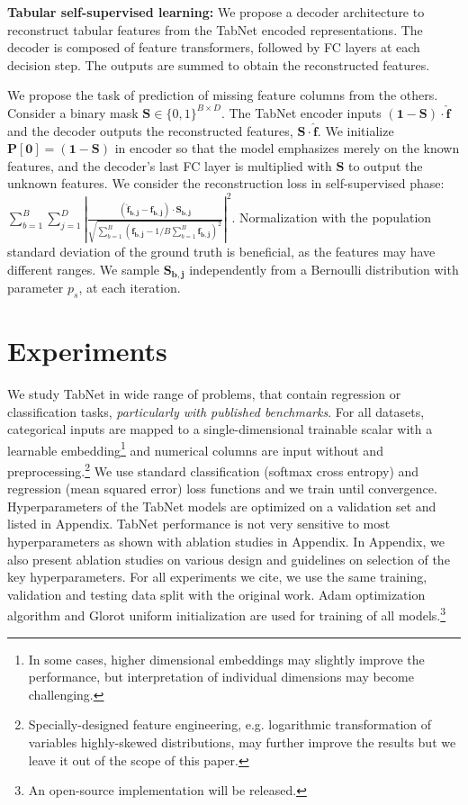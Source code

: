 {\textbf{Tabular self-supervised learning:}} We propose a decoder architecture to reconstruct tabular features from the TabNet encoded representations. The decoder is composed of feature transformers, followed by FC layers at each decision step. The outputs are summed to obtain the reconstructed features.

We propose the task of prediction of missing feature columns from the others. Consider a binary mask $\mathbf{S} \in \{ 0, 1 \} ^ {B \times D}$. The TabNet encoder inputs $(\mathbf{1} - \mathbf{S}) \cdot \mathbf{\hat{f}}$ and the decoder outputs the reconstructed features, $\mathbf{S} \cdot \mathbf{\hat{f}}$. 
We initialize $\mathbf{P[0]} = (\mathbf{1} - \mathbf{S})$ in encoder so that the model emphasizes merely on the known features, and the decoder's last FC layer is multiplied with $\mathbf{S}$ to output the unknown features. We consider the reconstruction loss in self-supervised phase:
$\sum_{b=1}^{B} \sum_{j=1}^{D} \left | 
\frac{ ({\mathbf{\hat{f}_{b,j}}} - \mathbf{f_{b,j}}) \cdot \mathbf{\mathbf{S_{b,j}}}}
{\sqrt{\sum_{b=1}^{B} (\mathbf{f_{b,j}} - {1/B} \sum_{b=1}^{B} \mathbf{f_{b,j}})^{2}}}
\right | ^2. $ Normalization with the population standard deviation of the ground truth is beneficial, as the features may have different ranges. We sample $\mathbf{S_{b,j}}$ independently from a Bernoulli distribution with parameter $p_s$, at each iteration. 

\section{Experiments}

We study TabNet in wide range of problems, that contain regression or classification tasks, \emph{particularly with published benchmarks}. For all datasets, categorical inputs are mapped to a single-dimensional trainable scalar with a learnable embedding\footnote{In some cases, higher dimensional embeddings may slightly improve the performance, but interpretation of individual dimensions may become challenging.} and numerical columns are input without and preprocessing.\footnote{Specially-designed feature engineering, e.g. logarithmic transformation of variables highly-skewed distributions, may further improve the results but we leave it out of the scope of this paper.} We use standard classification (softmax cross entropy) and regression (mean squared error) loss functions and we train until convergence. Hyperparameters of the TabNet models are optimized on a validation set and listed in Appendix. TabNet performance is not very sensitive to most hyperparameters as shown with ablation studies in Appendix. In Appendix, we also present ablation studies on various design and guidelines on selection of the key hyperparameters. For all experiments we cite, we use the same training, validation and testing data split with the original work. Adam optimization algorithm \citep{adam} and Glorot uniform initialization are used for training of all models.\footnote{An open-source implementation will be released.}

